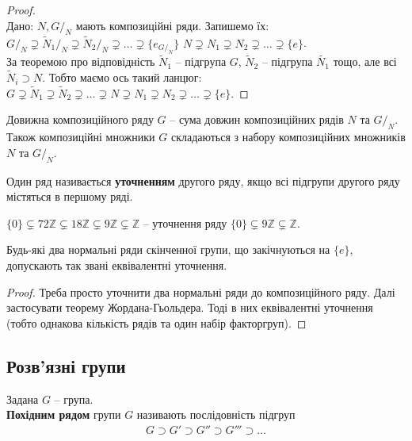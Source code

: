 \documentclass{math_library}
\begin{document}
\begin{proof}
\bigskip \\
\leftproof Дано: $N,G/_N$ мають композиційні ряди. Запишемо їх:\\
$G/_N \supsetneq {\tilde{N}_1}/_N \supsetneq {\tilde{N}_2}/_N  \supsetneq \dots \supsetneq \{e_{G/_N}\}$ \qquad $N \supsetneq N_1 \supsetneq N_2 \supsetneq \dots \supsetneq \{e\}$.\\
За теоремою про відповідність $\tilde{N}_1$ -- підгрупа $G$, $\tilde{N}_2$ -- підгрупа $\tilde{N_1}$ тощо, але всі $\tilde{N}_i \supset N$. Тобто маємо ось такий ланцюг:\\
$G \supsetneq \tilde{N}_1 \supsetneq \tilde{N}_2 \supsetneq \dots \supsetneq N \supsetneq N_1 \supsetneq N_2 \supsetneq \dots \supsetneq \{e\}$.
\end{proof}

\begin{corollary}
Довижна композиційного ряду $G$ -- сума довжин композиційних рядів $N$ та $G/_N$. Також композиційні множники $G$ складаються з набору композиційних множників $N$ та $G/_N$.
\end{corollary}

\begin{definition}
Один ряд називається \textbf{уточненням} другого ряду, якщо всі підгрупи другого ряду містяться в першому ряді.
\end{definition}

\begin{example}
$\{0\} \subsetneq 72 \mathbb{Z} \subsetneq 18 \mathbb{Z} \subsetneq 9 \mathbb{Z} \subsetneq \mathbb{Z}$ -- уточнення ряду $\{0\} \subsetneq 9 \mathbb{Z} \subsetneq \mathbb{Z}$.
\end{example}

\begin{theorem}
Будь-які два нормальні ряди скінченної групи, що закічнуються на $\{e\}$, допускають так звані еквівалентні уточнення.
\end{theorem}

\begin{proof}
Треба просто уточнити два нормальні ряди до композиційного ряду. Далі застосувати теорему Жордана-Гьольдера. Тоді в них еквівалентні уточнення (тобто однакова кількість рядів та один набір факторгруп).
\end{proof}

\subsection{Розв'язні групи}
\begin{definition}
Задана $G$ -- група.\\
\textbf{Похідним рядом} групи $G$ називають послідовність підгруп
\begin{align*}
G \supset G' \supset G'' \supset G''' \supset \dots
\end{align*}
\end{definition}
\end{document}
